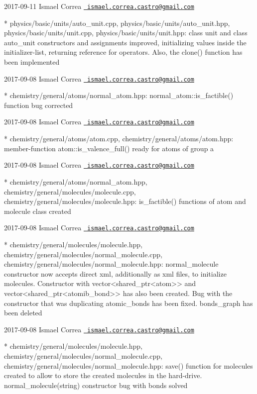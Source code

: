  2017-\/09-\/11 Ismael Correa \href{mailto:ismael.correa.castro@gmail.com}{\texttt{ ismael.\+correa.\+castro@gmail.\+com}} \begin{DoxyVerb}* physics/basic/units/auto_unit.cpp,
physics/basic/units/auto_unit.hpp, physics/basic/units/unit.cpp,
physics/basic/units/unit.hpp: class unit and class auto_unit
constructors and assignments improved, initializing values inside
the initializer-list, returning reference for operators. Also, the
clone() function has been implemented
\end{DoxyVerb}
 2017-\/09-\/08 Ismael Correa \href{mailto:ismael.correa.castro@gmail.com}{\texttt{ ismael.\+correa.\+castro@gmail.\+com}} \begin{DoxyVerb}* chemistry/general/atoms/normal_atom.hpp: 
normal_atom::is_factible() function bug corrected
\end{DoxyVerb}
 2017-\/09-\/08 Ismael Correa \href{mailto:ismael.correa.castro@gmail.com}{\texttt{ ismael.\+correa.\+castro@gmail.\+com}} \begin{DoxyVerb}* chemistry/general/atoms/atom.cpp,
chemistry/general/atoms/atom.hpp: member-function
atom::is_valence_full() ready for atoms of group a
\end{DoxyVerb}
 2017-\/09-\/08 Ismael Correa \href{mailto:ismael.correa.castro@gmail.com}{\texttt{ ismael.\+correa.\+castro@gmail.\+com}} \begin{DoxyVerb}* chemistry/general/atoms/normal_atom.hpp,
chemistry/general/molecules/molecule.cpp,
chemistry/general/molecules/molecule.hpp: is_factible() functions of
atom and molecule class created
\end{DoxyVerb}
 2017-\/09-\/08 Ismael Correa \href{mailto:ismael.correa.castro@gmail.com}{\texttt{ ismael.\+correa.\+castro@gmail.\+com}} \begin{DoxyVerb}* chemistry/general/molecules/molecule.hpp,
chemistry/general/molecules/normal_molecule.cpp,
chemistry/general/molecules/normal_molecule.hpp: normal_molecule
constructor now accepts direct xml, additionally as xml files, to
initialize molecules. Constructor with vector<shared_ptr<atom>> and
vector<shared_ptr<atomib_bond>> has also been created. Bug with the
constructor that was duplicating atomic_bonds has been fixed.
bonds_graph has been deleted
\end{DoxyVerb}
 2017-\/09-\/08 Ismael Correa \href{mailto:ismael.correa.castro@gmail.com}{\texttt{ ismael.\+correa.\+castro@gmail.\+com}} \begin{DoxyVerb}* chemistry/general/molecules/molecule.hpp,
chemistry/general/molecules/normal_molecule.cpp,
chemistry/general/molecules/normal_molecule.hpp: save() function for
molecules created to allow to store the created molecules in the
hard-drive. normal_molecule(string) constructor bug with bonds
solved
\end{DoxyVerb}
